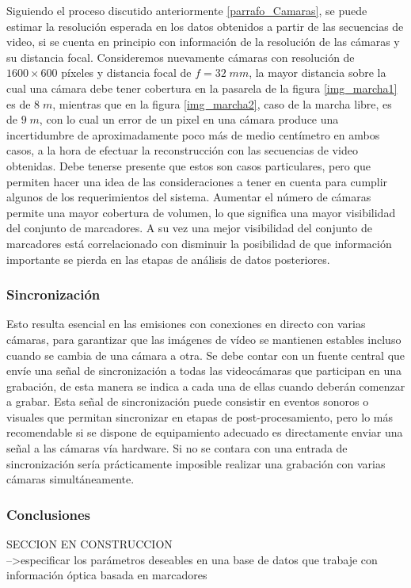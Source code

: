 Siguiendo el proceso discutido anteriormente \ref{parrafo_Camaras}, se puede estimar la resolución esperada en los datos obtenidos a partir de las secuencias de video, si se cuenta en principio con información de la resolución de las cámaras y su distancia focal. Consideremos nuevamente cámaras con resolución de $1600\times600$ píxeles y distancia focal de $f=32\;mm$, la mayor distancia sobre la cual una cámara debe tener cobertura en la pasarela de la figura \ref{img_marcha1} es de $8 \;m$, mientras que en la figura  \ref{img_marcha2}, caso de la marcha libre, es de $9\;m$, con lo cual un error de un pixel en una cámara produce una incertidumbre de aproximadamente poco más de medio centímetro en ambos casos, a la hora de efectuar la reconstrucción con las secuencias de video obtenidas. 
Debe tenerse presente que estos son casos particulares, pero que permiten hacer una idea de las consideraciones a tener en cuenta para cumplir algunos de los requerimientos del sistema. 
Aumentar el número de cámaras permite una mayor cobertura de volumen, lo que significa una mayor visibilidad del conjunto de marcadores. A su vez una mejor visibilidad del conjunto de marcadores está correlacionado con disminuir la posibilidad de que información importante se pierda en las etapas de análisis de datos posteriores.


\subsubsection{Sincronización} 

Esto resulta esencial en las emisiones con conexiones en directo con varias cámaras, para garantizar que las imágenes de vídeo se mantienen estables incluso cuando se cambia de una cámara a otra.
Se debe contar con un fuente central que envíe una señal de sincronización a todas las videocámaras que participan en una grabación, de esta manera se indica a cada una de ellas cuando deberán comenzar a grabar. 
Esta señal de sincronización puede consistir en eventos sonoros o visuales que permitan sincronizar en etapas de post-procesamiento, pero lo más recomendable si se dispone de equipamiento adecuado es directamente enviar una señal a las cámaras vía hardware.
Si no se contara con una entrada de sincronización sería prácticamente imposible realizar una grabación con varias cámaras simultáneamente.





\subsubsection{Conclusiones} SECCION EN CONSTRUCCION\\
-->especificar los parámetros deseables en una base de datos que trabaje con información óptica basada en marcadores



